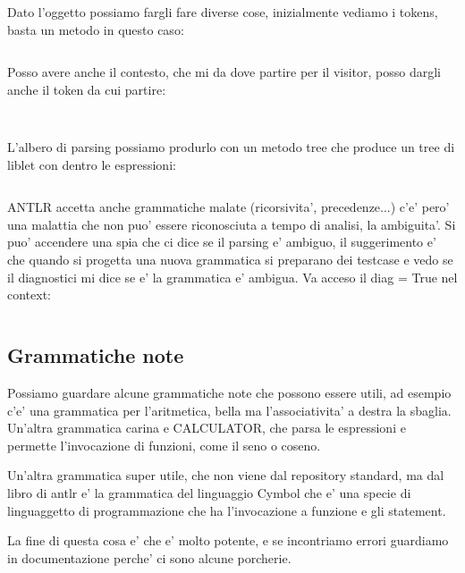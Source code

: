 Dato l'oggetto possiamo fargli fare diverse cose, inizialmente vediamo i tokens, basta un metodo in questo caso:
\begin{lstlisting}

\end{lstlisting}

Posso avere anche il contesto, che mi da dove partire per il visitor, posso dargli anche il token da cui partire:
\begin{lstlisting}


\end{lstlisting}

L'albero di parsing possiamo produrlo con un metodo tree che produce un tree di liblet con dentro le espressioni:
\begin{lstlisting}

\end{lstlisting}

ANTLR accetta anche grammatiche malate (ricorsivita', precedenze...) c'e' pero' una malattia che non puo' essere riconosciuta a tempo di analisi, la ambiguita'. Si puo' accendere una spia che ci dice se il parsing e' ambiguo, il suggerimento e' che quando si progetta una nuova grammatica si preparano dei testcase e vedo se il diagnostici mi dice se e' la grammatica e' ambigua. Va acceso il diag = True nel context:
\begin{lstlisting}

\end{lstlisting}


\subsection{Grammatiche note}
Possiamo guardare alcune grammatiche note che possono essere utili, ad esempio c'e' una grammatica per l'aritmetica, bella ma l'associativita' a destra la sbaglia.
Un'altra grammatica carina e CALCULATOR, che parsa le espressioni e permette l'invocazione di funzioni, come il seno o coseno.

Un'altra grammatica super utile, che non viene dal repository standard, ma dal libro di antlr e' la grammatica del linguaggio Cymbol che e' una specie di linguaggetto di programmazione che ha l'invocazione a funzione e gli statement.

La fine di questa cosa e' che e' molto potente, e se incontriamo errori guardiamo in documentazione perche' ci sono alcune porcherie.

